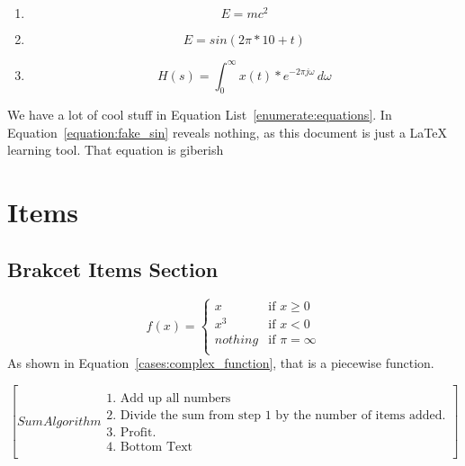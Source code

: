 \documentclass[12pt]{report}
\begin{document}
\begin{enumerate}
    \label{enumerate:equations}
    \item 
        \begin{equation}
        E = mc^2
        \label{equation:energy}
        \end{equation}
    
    \item
        \begin{equation}
        E = sin(2\pi * 10 + t)
        \label{equation:fake_sin}
        \end{equation}

    \item
        \begin{equation}
            H(s) = \int_{0}^{\infty} x(t) * e^{-2\pi j \omega} \,d\omega
        \label{equation:f_transform}
        \end{equation}
\end{enumerate}
We have a lot of cool stuff in Equation List~\ref{enumerate:equations}. In Equation~\ref{equation:fake_sin} reveals nothing, as this document is just a LaTeX learning tool. That equation is giberish

\chapter{Items}
\label{chapter:bracket_items}

\section{Brakcet Items Section}
\label{section:b_items}


\[
f(x) = 
\begin{cases}
\label{cases:complex_function}
x & \text{if } x \ge 0 \\
x^3 & \text{if } x < 0 \\
nothing & \text{if } \pi = \infty \\
\end{cases}
\]
As shown in Equation~\ref{cases:complex_function}, that is a piecewise function.

\[
\left[
Sum Algorithm
\begin{array}{l}
\label{array:sum_algorithm} \\
    \text{1. Add up all numbers} \\
    \text{2. Divide the sum from step 1 by the number of items added.} \\
    \text{3. Profit.} \\
    \text{4. Bottom Text} \\
\end{array}
\right]
\]
\end{document}
